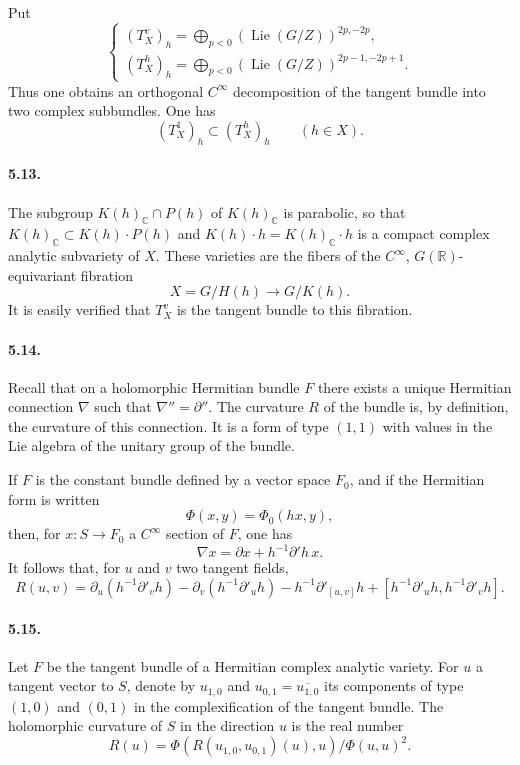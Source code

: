 \documentclass[10pt]{article}
\newcommand{\C}{\mathbb C}
\newcommand{\R}{\mathbb R}
\theoremstyle{deligne}
\newcommand{\Lie}{\operatorname{Lie}}
\begin{document}
Put
\[
\tag{5.12.3}
\begin{cases}
 (T_X^v)_h=\displaystyle\bigoplus_{p<0}(\Lie(G/Z))^{2p,-2p},\\[0.4em]
 (T_X^h)_h=\displaystyle\bigoplus_{p<0}(\Lie(G/Z))^{2p-1,-2p+1}.
\end{cases}
\]
Thus one obtains an orthogonal $C^\infty$ decomposition of the tangent bundle into two complex subbundles. One has
\[
\tag{5.12.4}
  (T_X^1)_h\subset (T_X^h)_h \qquad (h\in X).
\]

\paragraph{5.13.}
The subgroup $K(h)_\C\cap P(h)$ of $K(h)_\C$ is parabolic, so that $K(h)_\C\subset K(h)\cdot P(h)$ and $K(h)\cdot h=K(h)_\C\cdot h$ is a compact complex analytic subvariety of $X$. These varieties are the fibers of the $C^\infty$, $G(\R)$-equivariant fibration
\[
  X=G/H(h)\longrightarrow G/K(h).
\]
It is easily verified that $T_X^v$ is the tangent bundle to this fibration.

\paragraph{5.14.}
Recall that on a holomorphic Hermitian bundle $F$ there exists a unique Hermitian connection $\nabla$ such that $\nabla''=\partial''$. The curvature $R$ of the bundle is, by definition, the curvature of this connection. It is a form of type $(1,1)$ with values in the Lie algebra of the unitary group of the bundle.

If $F$ is the constant bundle defined by a vector space $F_0$, and if the Hermitian form is written
\[
\tag{5.14.1}
  \Phi(x,y)=\Phi_0(hx,y),
\]
then, for $x:S\to F_0$ a $C^\infty$ section of $F$, one has
\[
\tag{5.14.2}
  \nabla x=\partial x+h^{-1}\partial' h\,x.
\]
It follows that, for $u$ and $v$ two tangent fields,
\[
\tag{5.14.3}
  R(u,v)=
  \partial_u(h^{-1}\partial'_v h)
  -\partial_v(h^{-1}\partial'_u h)
  -h^{-1}\partial'_{[u,v]}h
  +[h^{-1}\partial'_u h,h^{-1}\partial'_v h].
\]

\paragraph{5.15.}
Let $F$ be the tangent bundle of a Hermitian complex analytic variety. For $u$ a tangent vector to $S$, denote by $u_{1,0}$ and $u_{0,1}=\overline{u_{1,0}}$ its components of type $(1,0)$ and $(0,1)$ in the complexification of the tangent bundle. The holomorphic curvature of $S$ in the direction $u$ is the real number
\[
\tag{5.15.1}
  R(u)=
  \Phi(R(u_{1,0},u_{0,1})(u),u)/\Phi(u,u)^2.
\]
\end{document}
